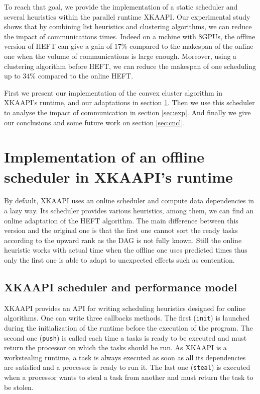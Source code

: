 \documentclass[10pt, conference, compsocconf,pdftex,dvipsnames]{IEEEtran}
\begin{document}
To reach that goal, we provide the implementation of  a static scheduler and
several heuristics within the parallel runtime XKAAPI. Our experimental study
shows that by combining list heuristics and clustering algorithms, we can
reduce the impact of communications times. Indeed on a mchine with 8GPUs, the
offline version of HEFT can give a gain of $17\%$ compared to the makespan of
the online one when the volume of communications is large enough.  Moreover,
using a clustering algorithm before HEFT, we can reduce the makespan of one
scheduling up to $34\%$ compared to the online HEFT.

First we present our implementation of the convex cluster algorithm in
XKAAPI's runtime, and our adaptations  in section \ref{sec:impl}. Then we use
this scheduler to analyse the impact of communication in section
\ref{sec:exp}. And finally we give our conclusions and some future work on
section \ref{sec:cncl}.

\section{Implementation of an offline scheduler in XKAAPI's runtime}
\label{sec:impl}

By default, XKAAPI uses an online scheduler and compute data dependencies in a
lazy way. Its scheduler provides various heuristics, among them, we can find
an online adaptation of the HEFT algorithm. The main difference between this
version and the original one is that the first one cannot sort the ready tasks
according to the upward rank as the DAG is not fully known.  Still the online
heuristic works with actual time when the offline one uses predicted times thus
only the first one is able to adapt to unexpected effects such as contention.

\subsection{XKAAPI scheduler and performance model}
\label{sec:impl-kaapi}

XKAAPI provides an API for writing scheduling heuristics designed for online
algorithms. One can write three callbacks methods. The first (\texttt{init})
is launched during the initialization of the runtime before the execution of
the program.  The second one (\texttt{push}) is called each time a tasks is
ready to be executed and must return the processor on which the tasks should
be run. As XKAAPI is a workstealing runtime, a task is always executed as soon
as all its dependencies are satisfied and a processor is ready to run it. The
last one (\texttt{steal}) is executed when a processor wants to steal a task
from another and must return the task to be stolen.
\end{document}
